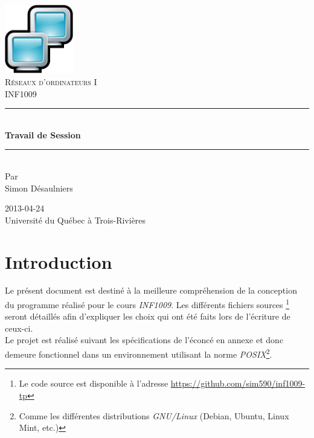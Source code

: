 \documentclass[11pt,french]{article}
\newcommand{\HRule}{\rule{\linewidth}{0.5mm}}
\begin{document}
    \begin{titlepage}
        \begin{center}
    
            \includegraphics[height=3cm]{./aux/network.png}
            \\[3cm]
            
            \textsc{\LARGE Réseaux d'ordinateurs I}
            \\[0.2cm]
            \textsc{\Large INF1009}
            \\[2cm]
            \HRule \\[0.5cm]
            {\huge \bfseries Travail de Session}
            \HRule \\[2cm]
            Par\\
            Simon Désaulniers

            \vfill
            2013-04-24\\
            Université du Québec à Trois-Rivières
            \thispagestyle{empty}
        \end{center}
    \end{titlepage}
    \newpage

    \setcounter{page}{1}
    \tableofcontents
    \newpage

    \setcounter{page}{1}
    
    \section*{Introduction} %
    \label{sec:intro}
        Le présent document est destiné à la meilleure compréhension de la conception
        du programme réalisé pour le cours \emph{INF1009}. Les différents fichiers sources
        \footnote{Le code source est disponible à l'adresse {\color{blue}\href{https://github.com/sim590/inf1009-tp}{https://github.com/sim590/inf1009-tp}}}
        seront détaillés afin d'expliquer les choix qui ont été faits lors de l'écriture
        de ceux-ci.\\

        Le projet est réalisé suivant les spécifications de l'éconcé en annexe et donc demeure
        fonctionnel dans un environnement utilisant la norme \emph{POSIX}\footnote{Comme les
        différentes distributions \emph{GNU/Linux} (Debian, Ubuntu, Linux Mint, etc.)}.
    
\end{document}

